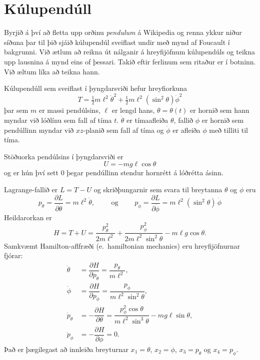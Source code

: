 \documentclass[11pt,icelandic]{article}
\begin{document}
\section{Kúlupendúll}

Byrjið á því að fletta upp orðinu {\it pendulum} á Wikipedia
og renna ykkur niður síðuna þar til þið sjáið kúlupendúl sveiflast 
undir með mynd af Foucault í bakgrunni.  Við ætlum að reikna 
út nálganir á hreyfijöfnum  kúlupendúls og teikna upp lausnina
á mynd eins of þessari.  Takið eftir ferlinum sem
ritaður er í botninn. Við æltum líka að teikna hann.  

\smallskip
Kúlupendúll sem sveiflast í þyngdarsviði hefur hreyfiorkuna
$$
T=\tfrac 12 m\ell^2\dot\theta^2+\tfrac 12 m\ell^2(\sin^2\theta)
 \dot \phi^2
$$
þar sem $m$ er massi pendúlsins, $\ell$ er lengd hans, $\theta=\theta(t)$ er
hornið sem hann myndar við lóðlínu sem fall af tíma $t$. $\dot\theta$ er 
tímaafleiða $\theta$, fallið $\phi$ er hornið sem pendúllinn myndar við
$xz$-planið sem fall af tíma og $\dot\phi$ er afleiða
$\phi$ með tilliti til tíma.

\smallskip
Stöðuorka pendúlsins í þyngdarsviði er 
$$
U=-mg\ell\cos \theta
$$
og er hún því sett $0$ þegar pendúllinn stendur hornrétt á lóðrétta
ásinn. 

\smallskip
Lagrange-fallið er $L=T-U$ og skriðþungarnir sem svara til 
breytanna $\theta$ og $\phi$ eru
\begin{equation*}
p_\theta=\dfrac{\partial L}{\partial\dot\theta}=m\ell^2\dot\theta,
\qquad \text{ og } \qquad 
p_\phi=\dfrac{\partial L}{\partial\dot\phi}
=m\ell^2(\sin^2 \theta) \, \dot\phi
\end{equation*}
Heildarorkan er
$$
H=T+U=\dfrac{p_\theta^2}{2m\ell^2}+
\dfrac{p_\phi^2}{2m\ell^2\sin^2\theta}-m\ell g\cos \theta.
$$
Samkvæmt Hamilton-aflfræði (e.~hamiltonian mechanics) 
eru hreyfijöfnurnar fjórar:
\begin{align*}
  \dot\theta&=\dfrac{\partial H}{\partial p_\theta}=\dfrac{p_\theta}{m\ell^2},\\
  \dot\phi&=\dfrac{\partial H}{\partial
    p_\phi}=\dfrac{p_\phi}{m\ell^2\sin^2\theta},\\ 
\dot p_\theta&=-\dfrac{\partial H}{\partial \theta}
=\dfrac{p_\phi^2\cos\theta}{m\ell^2\sin^3\theta}-mg\ell\sin \theta,\\
\dot p_\phi&=-\dfrac{\partial H}{\partial \phi}=0.
\end{align*}
Það er þægilegast að  innleiða breyturnar
$x_1=\theta$, $x_2=\phi$, $x_3=p_\theta$ og $x_4=p_\phi$.
                                                                                                                                                                              
\end{document}

